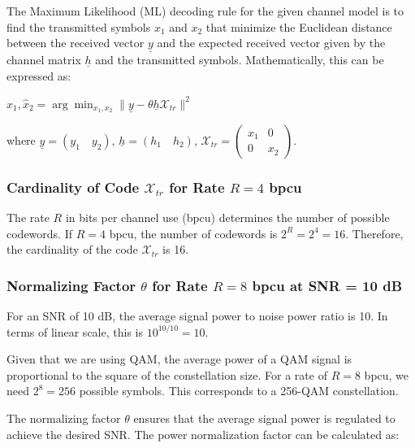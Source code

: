 \documentclass[11pt]{article}
\begin{document}
The Maximum Likelihood (ML) decoding rule for the given channel model is
to find the transmitted symbols \(x_1\) and \(x_2\) that minimize the
Euclidean distance between the received vector \(\underline{y}\) and the
expected received vector given by the channel matrix \(\underline{h}\)
and the transmitted symbols. Mathematically, this can be expressed as:

\(\hat{x}_1, \hat{x}_2 = \arg\min_{x_1, x_2} \| \underline{y} - \theta \underline{h} \mathcal{X}_{tr} \|^2\)

where \(\underline{y} = (y_1 \quad y_2)\),
\(\underline{h} = (h_1 \quad h_2)\),
\(\mathcal{X}_{tr} = \begin{pmatrix} x_1 & 0 \\ 0 & x_2 \end{pmatrix}\).

\subsubsection{\texorpdfstring{Cardinality of Code \(\mathcal{X}_{tr}\)
for Rate \(R = 4\)
bpcu}{Cardinality of Code \textbackslash mathcal\{X\}\_\{tr\} for Rate R = 4 bpcu}}\label{cardinality-of-code-mathcalx_tr-for-rate-r-4-bpcu}

The rate \(R\) in bits per channel use (bpcu) determines the number of
possible codewords. If \(R = 4\) bpcu, the number of codewords is
\(2^R = 2^4 = 16\). Therefore, the cardinality of the code
\(\mathcal{X}_{tr}\) is 16.

\subsubsection{\texorpdfstring{Normalizing Factor \(\theta\) for Rate
\(R = 8\) bpcu at SNR = 10
dB}{Normalizing Factor \textbackslash theta for Rate R = 8 bpcu at SNR = 10 dB}}\label{normalizing-factor-theta-for-rate-r-8-bpcu-at-snr-10-db}

For an SNR of 10 dB, the average signal power to noise power ratio is
10. In terms of linear scale, this is \(10^{10/10} = 10\).

Given that we are using QAM, the average power of a QAM signal is
proportional to the square of the constellation size. For a rate of
\(R = 8\) bpcu, we need \(2^8 = 256\) possible symbols. This corresponds
to a 256-QAM constellation.

The normalizing factor \(\theta\) ensures that the average signal power
is regulated to achieve the desired SNR. The power normalization factor
can be calculated as:
\end{document}
